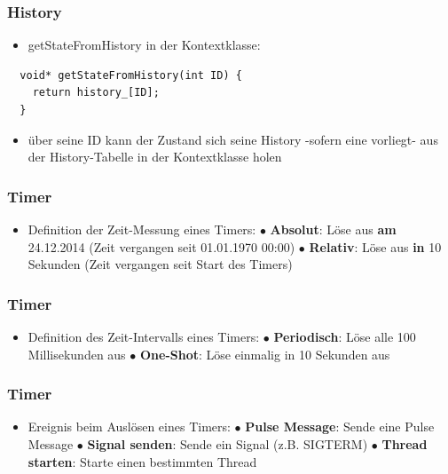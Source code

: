 \documentclass{beamer}
\begin{document}
\begin{frame}[fragile]
 \frametitle{History}
 \begin{itemize}
  \item getStateFromHistory in der Kontextklasse:
 \end{itemize}
 \begin{lstlisting}
  void* getStateFromHistory(int ID) {
    return history_[ID];
  }
 \end{lstlisting}
 \begin{itemize}
  \item \"uber seine ID kann der Zustand sich seine History -sofern eine vorliegt- aus der History-Tabelle in der Kontextklasse holen
 \end{itemize}
\end{frame}

\begin{frame}[fragile]
 \frametitle{Timer}
 \begin{itemize}
  \item Definition der Zeit-Messung eines Timers:\newline\newline
  $\bullet$ \textbf{Absolut}: L\"ose aus \textbf{am} 24.12.2014\newline
  (Zeit vergangen seit 01.01.1970 00:00)\newline\newline
  $\bullet$ \textbf{Relativ}: L\"ose aus \textbf{in} 10 Sekunden\newline
  (Zeit vergangen seit Start des Timers)
 \end{itemize}
\end{frame}

\begin{frame}[fragile]
 \frametitle{Timer}
 \begin{itemize}
  \item Definition des Zeit-Intervalls eines Timers:\newline\newline
  $\bullet$ \textbf{Periodisch}: L\"ose alle 100 Millisekunden aus\newline\newline
  $\bullet$ \textbf{One-Shot}: L\"ose einmalig in 10 Sekunden aus
 \end{itemize}
\end{frame}

\begin{frame}[fragile]
 \frametitle{Timer}
 \begin{itemize}
  \item Ereignis beim Ausl\"osen eines Timers:\newline\newline
  $\bullet$ \textbf{Pulse Message}: Sende eine Pulse Message\newline\newline
  $\bullet$ \textbf{Signal senden}: Sende ein Signal (z.B. SIGTERM)\newline\newline
  $\bullet$ \textbf{Thread starten}: Starte einen bestimmten Thread
 \end{itemize}
\end{frame}
\end{document}
